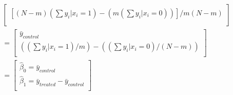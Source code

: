 \documentclass[12pt,letterpaper]{article}
\begin{document}
{\begin{eqnarray*}
\begin{bmatrix}
  [(N-m)(\sum y_i|x_i=1) - (m (\sum y_i|x_i=0))  ]/m (N-m) \\
 \end{bmatrix}\\
 =
  \begin{bmatrix} 
\bar{y}_{control} \\
  ((\sum y_i|x_i=1)/m) - ((\sum y_i|x_i=0)/(N-m))   \\
 \end{bmatrix}\\
 =
\begin{bmatrix} 
\hat{\beta}_0=\bar{y}_{control} \\
\hat{\beta}_1 =   \bar{y}_{treated} - \bar{y}_{control} \\
 \end{bmatrix}\\
\end{eqnarray*}

}
\fi

\end{document}
